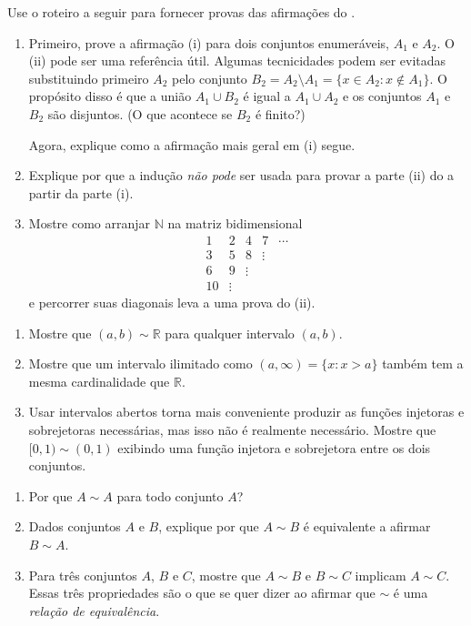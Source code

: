 \begin{exercise}\label{ex:prova-uniao-enumeravel}
Use o roteiro a seguir para fornecer provas das afirmações do .
\begin{enumerate}[label=\alph*)]
\item Primeiro, prove a afirmação (i) para dois conjuntos enumeráveis, $A_{1}$ e $A_{2}$. O  (ii) pode ser uma referência útil. Algumas tecnicidades podem ser evitadas substituindo primeiro $A_{2}$ pelo conjunto $B_{2} = A_{2} \setminus A_{1} = \{x \in A_{2} : x \notin A_{1}\}$. O propósito disso é que a união $A_{1} \cup B_{2}$ é igual a $A_{1} \cup A_{2}$ e os conjuntos $A_{1}$ e $B_{2}$ são disjuntos. (O que acontece se $B_{2}$ é finito?)

Agora, explique como a afirmação mais geral em (i) segue.
\item Explique por que a indução \textit{não pode} ser usada para provar a parte (ii) do  a partir da parte (i).
\item Mostre como arranjar $\mathbb{N}$ na matriz bidimensional
\[
\begin{array}{ccccc}
1 & 2 & 4 & 7 & \cdots \\
3 & 5 & 8 & \vdots & \\
6 & 9 & \vdots & & \\
10 & \vdots & & &
\end{array}
\]
e percorrer suas diagonais leva a uma prova do  (ii).
\end{enumerate}
\end{exercise}

\begin{exercise}\label{ex:intervalos-cardinalidade-R}
\begin{enumerate}[label=\alph*)]
\item Mostre que $(a, b) \sim \mathbb{R}$ para qualquer intervalo $(a, b)$.
\item Mostre que um intervalo ilimitado como $(a, \infty) = \{x : x > a\}$ também tem a mesma cardinalidade que $\mathbb{R}$.
\item Usar intervalos abertos torna mais conveniente produzir as funções injetoras e sobrejetoras necessárias, mas isso não é realmente necessário. Mostre que $[0, 1) \sim (0, 1)$ exibindo uma função injetora e sobrejetora entre os dois conjuntos.
\end{enumerate}
\end{exercise}

\begin{exercise}\label{ex:equivalencia-cardinalidade}
\begin{enumerate}[label=\alph*)]
\item Por que $A \sim A$ para todo conjunto $A$?
\item Dados conjuntos $A$ e $B$, explique por que $A \sim B$ é equivalente a afirmar $B \sim A$.
\item Para três conjuntos $A$, $B$ e $C$, mostre que $A \sim B$ e $B \sim C$ implicam $A \sim C$. Essas três propriedades são o que se quer dizer ao afirmar que $\sim$ é uma \textit{relação de equivalência}.
\end{enumerate}
\end{exercise}

